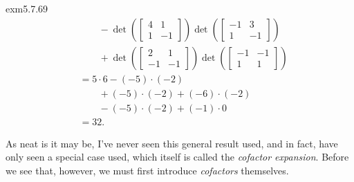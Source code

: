 \begin{exm}{}{exm5.7.69}
\begin{equation}
\begin{split}
			& \qquad -\det \left( \begin{bmatrix}4 & 1 \\ 1 & -1\end{bmatrix}\right) \det \left( \begin{bmatrix}-1 & 3 \\ 1 & -1\end{bmatrix}\right) \\ & \qquad +\det \left( \begin{bmatrix}2 & 1 \\ -1 & -1\end{bmatrix}\right) \det \left( \begin{bmatrix}-1 & -1 \\ 1 & 1\end{bmatrix}\right) \\
			& =5\cdot 6-(-5)\cdot (-2) \\
			& \qquad +(-5)\cdot (-2)+(-6)\cdot (-2) \\
			& \qquad -(-5)\cdot (-2)+(-1)\cdot 0 \\
			& =32.
		\end{split}
	\end{equation}
\end{exm}
As neat is it may be, I've never seen this general result used, and in fact, have only seen a special case used, which itself is called the \emph{cofactor expansion}.  Before we see that, however, we must first introduce \emph{cofactors} themselves.
